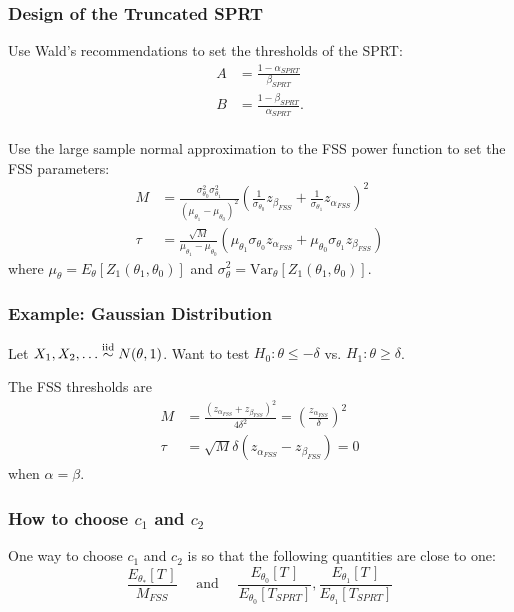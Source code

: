 \documentclass[10pt]{beamer}
\begin{document}
\begin{frame}
\frametitle{Design of the Truncated SPRT}

Use Wald's recommendations to set the thresholds of the SPRT:
\[
\begin{split}
A &= \frac{1 - \alpha_{SPRT}}{\beta_{SPRT}} \\
B &= \frac{1 - \beta_{SPRT}}{\alpha_{SPRT}}. \\
\end{split}
\]

Use the large sample normal approximation to the FSS power function to set the FSS parameters:
\[
\begin{split}
M &= \frac{\sigma_{\theta_0}^2 \sigma_{\theta_1}^2}{(\mu_{\theta_1} - \mu_{\theta_0})^2} \left(\frac{1}{\sigma_{\theta_0}} z_{\beta_{FSS}} + \frac{1}{\sigma_{\theta_1}}z_{\alpha_{FSS}}\right)^2 \\
\tau &= \frac{\sqrt{M}}{\mu_{\theta_1} - \mu_{\theta_0}} \left(\mu_{\theta_1} \sigma_{\theta_0} z_{\alpha_{FSS}} + \mu_{\theta_0} \sigma_{\theta_1} z_{\beta_{FSS}}\right)
\end{split}
\]
where $\mu_{\theta} = E_{\theta}\left[Z_1(\theta_1, \theta_0)\right]$ and $\sigma^2_{\theta} = \text{Var}_{\theta}\left[Z_1(\theta_1, \theta_0)\right]$.

\end{frame}

\begin{frame}
\frametitle{Example: Gaussian Distribution}

Let $X_1, X_2, \dots  \overset{\text{iid}}\sim N(\theta, 1)$. Want to test $H_0: \theta \leq -\delta$ vs. $H_1: \theta \geq \delta$.

The FSS thresholds are
\[
\begin{split}
M &= \frac{(z_{\alpha_{FSS}} + z_{\beta_{FSS}})^2}{4 \delta^2} = \left(\frac{z_{\alpha_{FSS}}}{\delta}\right)^2\\
\tau &= \sqrt{M} \delta (z_{\alpha_{FSS}} - z_{\beta_{FSS}}) = 0
\end{split}
\]
when $\alpha = \beta$.

\end{frame}

\begin{frame}
\frametitle{How to choose $c_1$ and $c_2$}

One way to choose $c_1$ and $c_2$ is so that the following quantities are close to one:
\[
\frac{E_{\theta_{*}}[T\,]}{M_{FSS}} \quad \text{ and } \quad \frac{E_{\theta_0}[T\,]}{E_{\theta_0}[T_{SPRT}]}, \frac{E_{\theta_1}[T\,]}{E_{\theta_1}[T_{SPRT}]}
\]

\end{frame}
\end{document}
